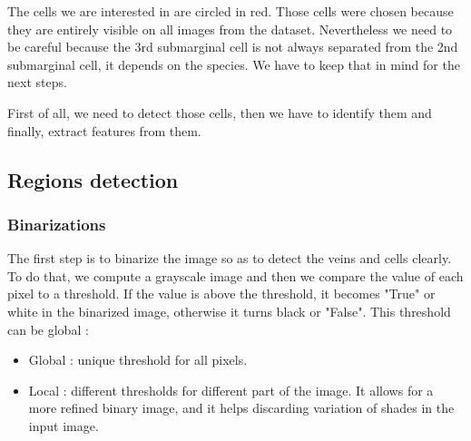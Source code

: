 \documentclass[a4paper]{article}
\begin{document}
The cells we are interested in are circled in red. Those cells were chosen because they are entirely visible on all images from the dataset. Nevertheless we need to be careful because the 3rd submarginal cell is not always separated from the 2nd submarginal cell, it depends on the species. We have to keep that in mind for the next steps.

First of all, we need to detect those cells, then we have to identify them and finally, extract features from them.
\newpage
\subsection{Regions detection}

\subsubsection{Binarizations}
The first step is to binarize the image so as to detect the veins and cells clearly. To do that, we compute a grayscale image and then we compare the value of each pixel to a threshold. If the value is above the threshold, it becomes "True" or white in the binarized image, otherwise it turns black or "False". This threshold can be global :
\begin{itemize}
    \item Global : unique threshold for all pixels.
    \item Local : different thresholds for different part of the image. It allows for a more refined binary image, and it helps discarding variation of shades in the input image.
\end{itemize}
\end{document}
